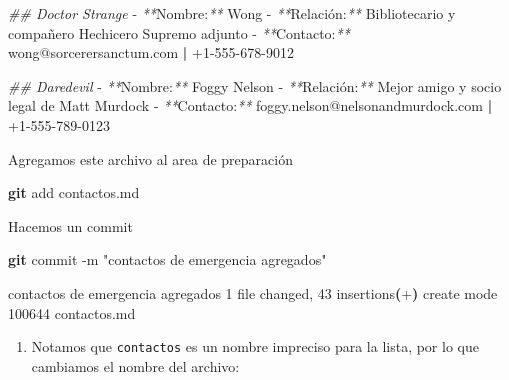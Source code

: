 \documentclass[
]{book}
\newenvironment{Shaded}{\begin{snugshade}}{\end{snugshade}}
\newcommand{\AttributeTok}[1]{\textcolor[rgb]{0.13,0.29,0.53}{#1}}
\newcommand{\CommentTok}[1]{\textcolor[rgb]{0.56,0.35,0.01}{\textit{#1}}}
\newcommand{\ErrorTok}[1]{\textcolor[rgb]{0.64,0.00,0.00}{\textbf{#1}}}
\newcommand{\ExtensionTok}[1]{#1}
\newcommand{\FunctionTok}[1]{\textcolor[rgb]{0.13,0.29,0.53}{\textbf{#1}}}
\newcommand{\KeywordTok}[1]{\textcolor[rgb]{0.13,0.29,0.53}{\textbf{#1}}}
\newcommand{\NormalTok}[1]{#1}
\newcommand{\PreprocessorTok}[1]{\textcolor[rgb]{0.56,0.35,0.01}{\textit{#1}}}
\newcommand{\StringTok}[1]{\textcolor[rgb]{0.31,0.60,0.02}{#1}}
\providecommand{\tightlist}{%
  \setlength{\itemsep}{0pt}\setlength{\parskip}{0pt}}
\begin{document}
\begin{Shaded}
\begin{Highlighting}[]
\CommentTok{\#\# Doctor Strange}
\ExtensionTok{{-}} \PreprocessorTok{**}\NormalTok{Nombre:}\PreprocessorTok{**}\NormalTok{ Wong  }
\ExtensionTok{{-}} \PreprocessorTok{**}\NormalTok{Relación:}\PreprocessorTok{**}\NormalTok{ Bibliotecario y compañero Hechicero Supremo adjunto  }
\ExtensionTok{{-}} \PreprocessorTok{**}\NormalTok{Contacto:}\PreprocessorTok{**}\NormalTok{ wong@sorcerersanctum.com }\KeywordTok{|} \ExtensionTok{+1{-}555{-}678{-}9012}

\CommentTok{\#\# Daredevil}
\ExtensionTok{{-}} \PreprocessorTok{**}\NormalTok{Nombre:}\PreprocessorTok{**}\NormalTok{ Foggy Nelson  }
\ExtensionTok{{-}} \PreprocessorTok{**}\NormalTok{Relación:}\PreprocessorTok{**}\NormalTok{ Mejor amigo y socio legal de Matt Murdock  }
\ExtensionTok{{-}} \PreprocessorTok{**}\NormalTok{Contacto:}\PreprocessorTok{**}\NormalTok{ foggy.nelson@nelsonandmurdock.com }\KeywordTok{|} \ExtensionTok{+1{-}555{-}789{-}0123}
\end{Highlighting}
\end{Shaded}

Agregamos este archivo al area de preparación

\begin{Shaded}
\begin{Highlighting}[]
\FunctionTok{git}\NormalTok{ add contactos.md  }
\end{Highlighting}
\end{Shaded}

Hacemos un commit

\begin{Shaded}
\begin{Highlighting}[]
\FunctionTok{git}\NormalTok{ commit }\AttributeTok{{-}m} \StringTok{"contactos de emergencia agregados"}
\end{Highlighting}
\end{Shaded}

\begin{Shaded}
\begin{Highlighting}[]
\ExtensionTok{[main}\NormalTok{ 1c7fe32] contactos de emergencia agregados}
 \ExtensionTok{1}\NormalTok{ file changed, 43 insertions}\ErrorTok{(}\ExtensionTok{+}\KeywordTok{)}
 \ExtensionTok{create}\NormalTok{ mode 100644 contactos.md}
\end{Highlighting}
\end{Shaded}

\begin{enumerate}
\def\labelenumi{\arabic{enumi}.}
\setcounter{enumi}{1}
\tightlist
\item
  Notamos que \texttt{contactos} es un nombre impreciso para la lista, por lo que cambiamos el nombre del archivo:
\end{enumerate}
\end{document}
